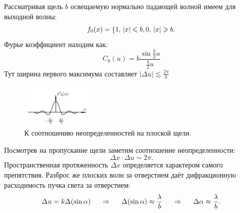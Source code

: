 Рассматривая щель $b$ освещаемую нормально падающей волной имеем для выходной волны:
\begin{equation*}
	f_0(x) = \left\{
	1, \, |x| \leq b,\\
	0, \, |x| \geq b.
	\right.
\end{equation*}
Фурье коэффициент находим как:
\begin{equation*}
	C_0(u) = b \frac{\sin \frac{b}{2}u}{\frac{b}{2}u}
\end{equation*}
Тут ширина первого максимума составляет $|\Delta u|\lesssim \frac{2 \pi}{b}$
\begin{figure}[ht]
    \centering
    \includegraphics[width=0.3\textwidth]{figures/328.png}
    \caption{К соотношению неопределенностей на плоской щели.}
\end{figure}
Посмотрев на пропускание щели заметим соотношение неопределенности:
\begin{equation*}
	\Delta x \cdot \Delta u \sim 2 \pi.
\end{equation*}
Пространственная протяженность $\Delta x$ определяется характером самого препятствия. Разброс же плоских волн за отверстием даёт дифракционную расходимость пучка света за отверстием:
\begin{equation*}
	\Delta u = k \Delta(\sin \alpha)
	\hspace{0.5 cm}
	\Rightarrow
	\hspace{0.5 cm}
	\Delta(\sin \alpha) \approx \frac{\lambda}{b}
	\hspace{0.5 cm}
	\Rightarrow
	\hspace{0.5 cm}
	\Delta \alpha \approx \frac{\lambda}{b}.
\end{equation*}

